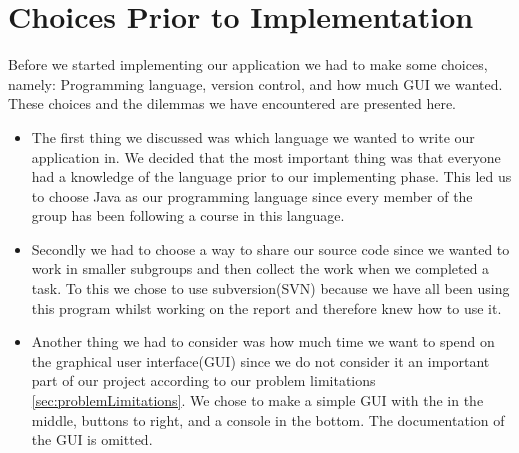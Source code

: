 \chapter{Choices Prior to Implementation}
Before we started implementing our application we had to make some choices, namely: Programming language, version control, and how much GUI we wanted.
These choices and the dilemmas we have encountered are presented here.

\begin{itemize}
	\item The first thing we discussed was which language we wanted to write our application in.
We decided that the most important thing was that everyone had a knowledge of the language prior to our implementing phase.
This led us to choose Java as our programming language since every member of the group has been following a course in this language.

	\item Secondly we had to choose a way to share our source code since we wanted to work in smaller subgroups and then collect the work when we completed a task.
To this we chose to use subversion(SVN) because we have all been using this program whilst working on the report and therefore knew how to use it.

	\item Another thing we had to consider was how much time we want to spend on the graphical user interface(GUI) since we do not consider it an important part of our project according to our problem limitations \ref{sec:problemLimitations}.
We chose to make a simple GUI with the \rubik{} in the middle, buttons to right, and a console in the bottom.
The documentation of the GUI is omitted.
\end{itemize}

